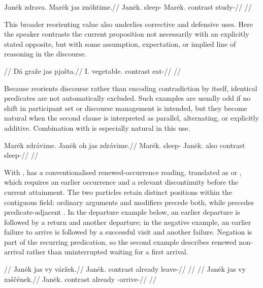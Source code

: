 \pex
\begingl
\gla Janėk zdrava. Marėk jas znóhtime.//
\glb Janėk.\Dir{} sleep-\Cont{} Marėk.\Dir{} contrast study-\Prog{}//
\glft {}//
\endgl
\xe

This broader reorienting value also underlies corrective and defensive uses.
Here the speaker contrasts the current proposition not necessarily with an
explicitly stated opposite, but with some assumption, expectation, or implied
line of reasoning in the discourse.

\pex
\begingl
\glpreamble {}//
\gla Dá graže jas pjašta.//
\glb I.\Dir{} vegetable.\Ind{} contrast eat-\Cont{}//
\glft {}//
\endgl
\xe

Because  reorients discourse rather than encoding contradiction by
itself, identical predicates are not automatically excluded. Such examples are
usually odd if no shift in participant set or discourse management is intended,
but they become natural when the second clause is interpreted as parallel,
alternating, or explicitly additive. Combination with  is especially
natural in this use.

\pex
\begingl
\gla Marėk zdrávime. Janėk oh jas zdrávime.//
\glb Marėk.\Dir{} sleep-\Prog{} Janėk.\Dir{} also contrast sleep-\Prog{}//
\glft {}//
\endgl
\xe

With ,  has a conventionalised renewed-occurrence reading,
translated as  or , which requires an earlier
occurrence and a relevant discontinuity before the current attainment.
The two particles retain distinct positions within the contiguous field:
ordinary arguments and modifiers precede both, while  precedes
predicate-adjacent . In the departure example below, an earlier
departure is followed by a return and another departure; in the negative
example, an earlier failure to arrive is followed by a successful visit and
another failure. Negation is part of the recurring predication, so the
second example describes renewed non-arrival rather than uninterrupted
waiting for a first arrival.

\pex
\a
\begingl
\glpreamble {}//
\gla Janėk jas vy váržek.//
\glb Janėk.\Dir{} contrast already leave-\Pf{}//
\glft {}//
\endgl
\a
\begingl
\glpreamble {}//
\gla Janėk jas vy zaščének.//
\glb Janėk.\Dir{} contrast already \Neg{}-arrive-\Pf{}//
\glft {}//
\endgl
\xe

